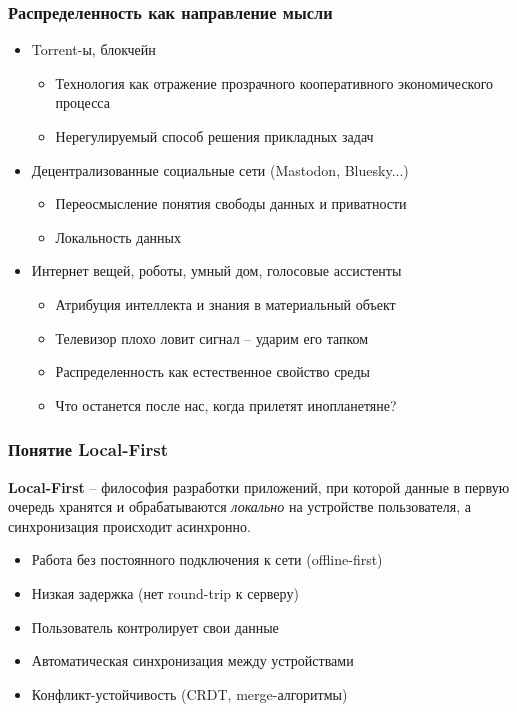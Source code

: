 \documentclass{beamer}
\begin{document}
\begin{frame}
  \frametitle{Распределенность как направление мысли}

 \begin{itemize}
    \item Torrent-ы, блокчейн
    \begin{itemize}
        \item Технология как отражение прозрачного кооперативного экономического процесса
        \item Нерегулируемый способ решения прикладных задач
    \end{itemize}

    \item Децентрализованные социальные сети (Mastodon, Bluesky...)
    \begin{itemize}
        \item Переосмысление понятия свободы данных и приватности
        \item Локальность данных
    \end{itemize}

    \item Интернет вещей, роботы, умный дом, голосовые ассистенты
    \begin{itemize}
        \item Атрибуция интеллекта и знания в материальный объект
        \item Телевизор плохо ловит сигнал – ударим его тапком
        \item Распределенность как естественное свойство среды
        \item Что останется после нас, когда прилетят инопланетяне?
    \end{itemize}
  \end{itemize}

\end{frame}

\begin{frame}
  \frametitle{Понятие Local-First}

  {\bfseries Local-First} – философия разработки приложений, при которой
  данные в первую очередь хранятся и обрабатываются {\itshape локально} на устройстве пользователя,
  а синхронизация происходит асинхронно.

 \begin{itemize}
      \item Работа без постоянного подключения к сети (offline-first)
      \item Низкая задержка (нет round-trip к серверу)
      \item Пользователь контролирует свои данные
      \item Автоматическая синхронизация между устройствами
      \item Конфликт-устойчивость (CRDT, merge-алгоритмы)
  \end{itemize}
\end{frame}
\end{document}
